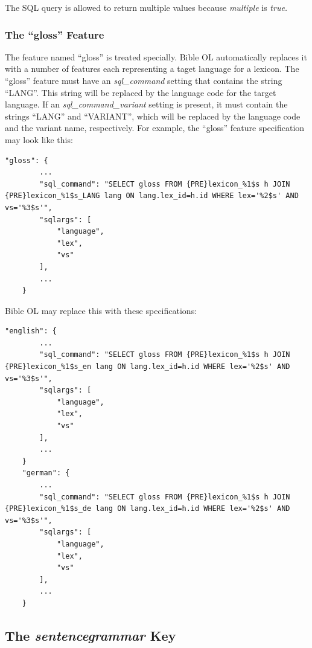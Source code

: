 \documentclass[11pt,oneside,a4paper]{memoir}
\begin{document}
The SQL query is allowed to return multiple values because \emph{multiple} is \emph{true.}


\subsubsection{The ``gloss'' Feature}\label{sec-gloss-feature}

The feature named ``gloss'' is treated specially. Bible OL automatically replaces it with a number
of features each representing a taget language for a lexicon. The ``gloss'' feature must have
an \emph{sql\_command} setting that contains the string ``LANG''. This string will be replaced by
the language code for the target language. If an \emph{sql\_command\_variant} setting is present, it must
contain the strings ``LANG'' and ``VARIANT'', which will be replaced by the language code and the
variant name, respectively. For example, the ``gloss'' feature specification may look
like this:

\begin{lstlisting}[escapechar=\#]
    "gloss": {
        ...
        "sql_command": "SELECT gloss FROM {PRE}lexicon_%1$s h JOIN {PRE}lexicon_%1$s_LANG lang ON lang.lex_id=h.id WHERE lex='%2$s' AND vs='%3$s'",
        "sqlargs": [
            "language",
            "lex",
            "vs"
        ],
        ...
    }
\end{lstlisting}

Bible OL may replace this with these specifications:

\begin{lstlisting}[escapechar=\#]
    "english": {
        ...
        "sql_command": "SELECT gloss FROM {PRE}lexicon_%1$s h JOIN {PRE}lexicon_%1$s_en lang ON lang.lex_id=h.id WHERE lex='%2$s' AND vs='%3$s'",
        "sqlargs": [
            "language",
            "lex",
            "vs"
        ],
        ...
    }
    "german": {
        ...
        "sql_command": "SELECT gloss FROM {PRE}lexicon_%1$s h JOIN {PRE}lexicon_%1$s_de lang ON lang.lex_id=h.id WHERE lex='%2$s' AND vs='%3$s'",
        "sqlargs": [
            "language",
            "lex",
            "vs"
        ],
        ...
    }
\end{lstlisting}


\subsection{The \emph{sentencegrammar} Key}\label{sentencegrammar}
\end{document}
